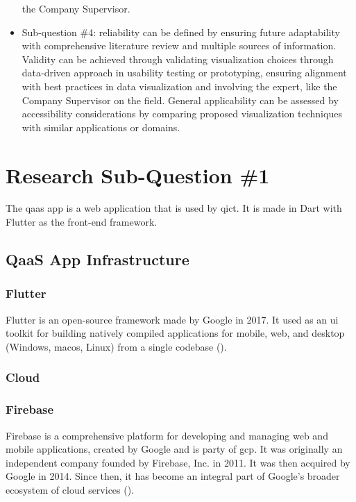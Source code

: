 \begin{multicols}{2}
\begin{itemize}[label=-]
                  the Company Supervisor.
            \item Sub-question \#4: reliability can be defined by ensuring future adaptability with comprehensive
                  literature review and multiple sources of information. Validity can be achieved through validating
                  visualization choices through data-driven approach in usability testing or  prototyping, ensuring
                  alignment with best practices in data visualization and involving the expert, like the Company
                  Supervisor on the field. General applicability can be assessed by accessibility considerations by
                  comparing proposed visualization techniques with similar applications or domains.
      \end{itemize}
      \section{Research Sub-Question \#1}
      The \acrshort{qaas} app is a web application that is used by \acrshort{qict}. It is made in Dart with Flutter as
      the front-end framework.

      \subsection{QaaS App Infrastructure}
      \subsubsection{Flutter}
      Flutter is an open-source framework made by Google in 2017. It used as an \acrshort{ui} toolkit for building
      natively compiled applications for mobile, web, and desktop (Windows, mac\acrshort{os}, Linux) from a single
      codebase (\cite{flutter}).

      \subsubsection{Cloud}
      \subsubsection{Firebase}
      Firebase is a comprehensive platform for developing and managing web and mobile applications, created by
      Google and is party of \acrshort{gcp}. It was originally an independent company founded by Firebase, Inc.
      in 2011. It was then acquired by Google in 2014. Since then, it has become an integral part of Google's
      broader ecosystem of cloud services (\cite{firebase}).


\end{multicols}
